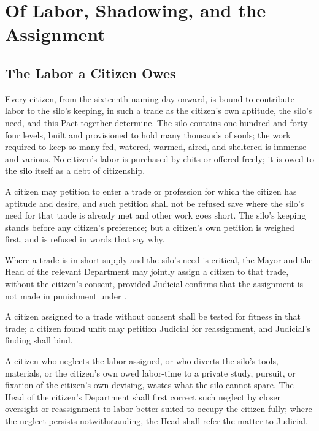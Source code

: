 \chapter{Of Labor, Shadowing, and the Assignment}
\label{art:labor}


\section{The Labor a Citizen Owes}
\label{sec:labor:labor-a-citizen-owes}

Every citizen, from the sixteenth naming-day onward, is bound to contribute labor to the silo's keeping, in such a trade as the citizen's own aptitude, the silo's need, and this Pact together determine. The silo contains one hundred and forty-four levels, built and provisioned to hold many thousands of souls; the work required to keep so many fed, watered, warmed, aired, and sheltered is immense and various. No citizen's labor is purchased by chits or offered freely; it is owed to the silo itself as a debt of citizenship.

\begin{clauses}
\item A citizen may petition to enter a trade or profession for which the citizen has aptitude and desire, and such petition shall not be refused save where the silo's need for that trade is already met and other work goes short. The silo's keeping stands before any citizen's preference; but a citizen's own petition is weighed first, and is refused in words that say why.
\item Where a trade is in short supply and the silo's need is critical, the Mayor and the Head of the relevant Department may jointly assign a citizen to that trade, without the citizen's consent, provided Judicial confirms that the assignment is not made in punishment under .
\item A citizen assigned to a trade without consent shall be tested for fitness in that trade; a citizen found unfit may petition Judicial for reassignment, and Judicial's finding shall bind.
\item A citizen who neglects the labor assigned, or who diverts the silo's tools, materials, or the citizen's own owed labor-time to a private study, pursuit, or fixation of the citizen's own devising, wastes what the silo cannot spare. The Head of the citizen's Department shall first correct such neglect by closer oversight or reassignment to labor better suited to occupy the citizen fully; where the neglect persists notwithstanding, the Head shall refer the matter to Judicial.
\end{clauses}

